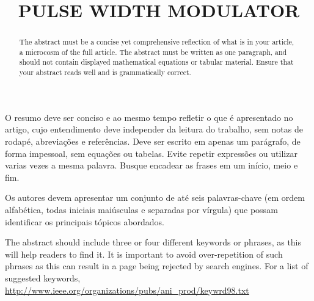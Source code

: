 
\title{PULSE WIDTH MODULATOR} %

\maketitle




\begin{resumo}  O resumo deve ser conciso e ao mesmo tempo refletir o que é apresentado no artigo, cujo entendimento deve independer da leitura do trabalho, sem notas de rodapé, abreviações e referências. Deve ser escrito em apenas um parágrafo, de forma impessoal, sem equações ou tabelas. Evite repetir expressões ou utilizar varias vezes a mesma palavra. Busque encadear as frases em um início, meio e fim.
\end{resumo}

\begin{palavraschave }
		Os autores devem apresentar um conjunto de até seis palavras-chave (em ordem alfabética, todas iniciais maiúsculas e separadas por vírgula) que possam identificar os principais tópicos abordados.	
\end{palavraschave }

\englishtitle

\begin{abstract}
	The abstract must be a concise yet comprehensive reflection of what is in your article, a microcosm of the full article. The abstract must be written as one paragraph, and should not contain displayed mathematical equations or tabular material.  Ensure that your abstract reads well and is grammatically correct.
\end{abstract}

\begin{keywords}
	The abstract should include three or four different keywords or phrases, as this will help readers to find it. It is important to avoid over-repetition of such phrases as this can result in a page being rejected by search engines. For a list of suggested keywords, \url{http://www.ieee.org/organizations/pubs/ani_prod/keywrd98.txt}
\end{keywords}




